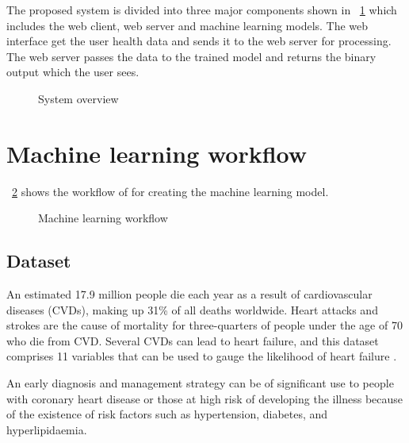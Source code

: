 
The proposed system is divided into three major components shown in \figurename~\ref{fig:sytem-overview} which includes the web client, web server and machine learning models. The web interface get the user health data and sends it to the web server for processing. The web server passes the data to the trained model and returns the binary output which the user sees.

\begin{figure}[htb]
	\centering
	\caption{System overview}
	\label{fig:sytem-overview}
\end{figure}


\section{Machine learning workflow}
\figurename~\ref{fig:ml-workflow} shows the workflow of for creating the machine learning model.

\begin{figure}[htb]
	\centering
	\caption{Machine learning workflow}
	\label{fig:ml-workflow}
\end{figure}

\subsection{Dataset}
An estimated 17.9 million people die each year as a result of cardiovascular diseases (CVDs), making up 31\% of all deaths worldwide. Heart attacks and strokes are the cause of mortality for three-quarters of people under the age of 70 who die from CVD. Several CVDs can lead to heart failure, and this dataset comprises 11 variables that can be used to gauge the likelihood of heart failure \citep{world-health-organization-2019}.

An early diagnosis and management strategy can be of significant use to people with coronary heart disease or those at high risk of developing the illness because of the existence of risk factors such as hypertension, diabetes, and hyperlipidaemia.


